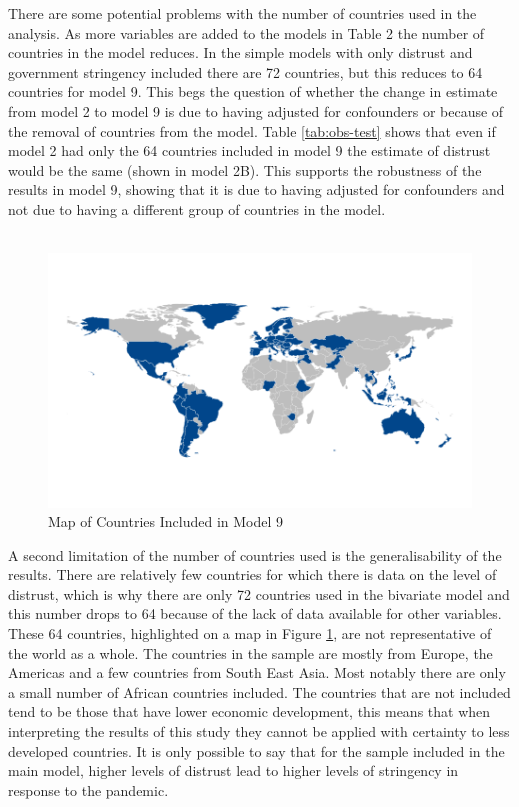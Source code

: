 \documentclass[
  11pt,
]{article}
\begin{document}
There are some potential problems with the number of countries used in the analysis. As more variables are added to the models in Table 2 the number of countries in the model reduces. In the simple models with only distrust and government stringency included there are 72 countries, but this reduces to 64 countries for model 9. This begs the question of whether the change in estimate from model 2 to model 9 is due to having adjusted for confounders or because of the removal of countries from the model. Table \ref{tab:obs-test} shows that even if model 2 had only the 64 countries included in model 9 the estimate of distrust would be the same (shown in model 2B). This supports the robustness of the results in model 9, showing that it is due to having adjusted for confounders and not due to having a different group of countries in the model.\\
~\\

\begin{figure}
\includegraphics[width=0.8\linewidth]{write_up_test_files/figure-latex/map-1} \caption{Map of Countries Included in Model 9}\label{fig:map}
\end{figure}

A second limitation of the number of countries used is the generalisability of the results. There are relatively few countries for which there is data on the level of distrust, which is why there are only 72 countries used in the bivariate model and this number drops to 64 because of the lack of data available for other variables. These 64 countries, highlighted on a map in Figure \ref{fig:map}, are not representative of the world as a whole. The countries in the sample are mostly from Europe, the Americas and a few countries from South East Asia. Most notably there are only a small number of African countries included. The countries that are not included tend to be those that have lower economic development, this means that when interpreting the results of this study they cannot be applied with certainty to less developed countries. It is only possible to say that for the sample included in the main model, higher levels of distrust lead to higher levels of stringency in response to the pandemic.\\
\end{document}
